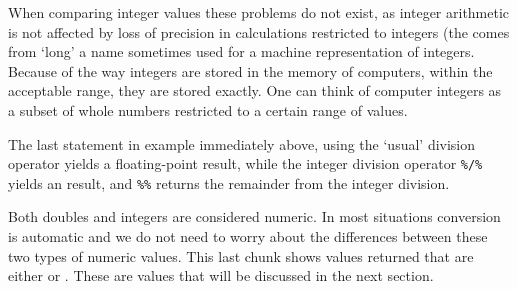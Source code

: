 \documentclass[paper=a4,headsepline,BCOR=12mm,twoside,open=right,%
titlepage,headings=small,fontsize=10pt,index=totoc,bibliography=totoc,%
captions=tableheading,captions=nooneline]{scrbook}\usepackage{knitr}
\begin{document}
When comparing integer values these problems do not exist, as integer arithmetic is not affected by loss of precision in calculations restricted to integers (the  comes from `long' a name sometimes used for a machine representation of integers. Because of the way integers are stored in the memory of computers, within the acceptable range, they are stored exactly. One can think of computer integers as a subset of whole numbers restricted to a certain range of values.

\begin{knitrout}\footnotesize
{}\color{fgcolor}
\end{knitrout}

The last statement in example immediately above, using the `usual' division operator yields a floating-point  result, while the integer division operator \verb|%/%| yields an  result, and \verb|%%| returns the remainder from the integer division.

Both doubles and integers are considered numeric. In most situations conversion is automatic and we do not need to worry about the differences between these two types of numeric values. This last chunk shows values returned that are either  or . These are  values that will be discussed in the next section.
\end{document}
